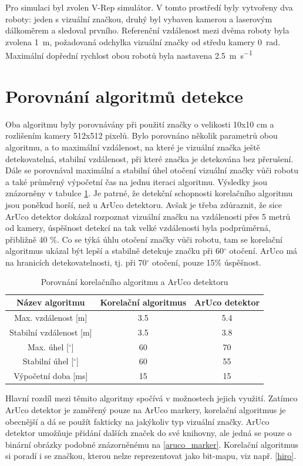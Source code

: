 \documentclass[twoside]{ctuthesis}
\theoremstyle{plain}
\theoremstyle{definition}
\theoremstyle{note}
\begin{document}
Pro simulaci byl zvolen V-Rep simulátor. V tomto prostředí byly vytvořeny dva roboty: jeden s vizuální značkou, druhý byl vybaven kamerou a laserovým dálkoměrem a sledoval prvního. Referenční vzdálenost mezi dvěma roboty byla zvolena \SI{1}{\meter}, požadovaná odchylka vizuální značky od středu kamery \SI{0}{\radian}. Maximální dopřední rychlost obou robotů byla nastavena \SI{2.5}{\meter\per\second}

\section{Porovnání algoritmů detekce}

Oba algoritmu byly porovnávány při použití značky o velikosti 10x10 cm a rozlišením kamery 512x512 pixelů. Bylo porovnáno několik parametrů obou algoritmu, a to maximální vzdálenost, na které je vizuální značka ještě detekovatelná, stabilní vzdálenost, při které značka je detekována bez přerušení. Dále se porovnával maximální a stabilní úhel otočení vizuální značky vůči robotu a také průměrný výpočetní čas na jednu iteraci algoritmu. Výsledky jsou znázorněny v tabulce \ref{porovnani}. Je patrné, že detekční schopnosti korelačního algoritmu jsou poněkud horší, než u ArUco detektoru. Avšak je třeba zdůraznit, že sice ArUco detektor dokázal rozpoznat vizuální značku na vzdálenosti přes 5 metrů od kamery, úspěšnost detekcí na tak velké vzdálenosti byla podprůměrná, přibližně 40 \%. Co se týká úhlu otočení značky vůči robotu, tam se korelační algoritmus ukázal být lepší a stabilně detekuje značku při 60$^\circ$ otočení. ArUco má na hranicích detekovatelnosti, tj. při 70$^\circ$ otočení, pouze 15\% úspěšnost.

\begin{table}[hbt]
	\centering
	\caption{Porovnání korelačního algoritmu a ArUco detektoru}
	\label{porovnani}
	\begin{tabular}{|c|c|c|}
		\hline
		Název algoritmu              & Korelační algoritmus & ArUco detektor \\ \hline
		Max. vzdálenost {[}m{]}      & 3.5                 & 5.4           \\ \hline
		Stabilní vzdálenost {[}m{]}  & 3.5                 & 3.8           \\ \hline
		Max. úhel {[}$^\circ${]}     & 60                   & 70             \\ \hline
		Stabilní úhel {[}$^\circ${]} & 60                   & 55             \\ \hline
		Výpočetní doba {[}ms{]}      & 15                   & 15             \\ \hline
	\end{tabular}
\end{table}
Hlavní rozdíl mezi těmito algoritmy spočívá v možnostech jejich využití. Zatímco ArUco detektor je zaměřený pouze na ArUco markery, korelační algoritmus je obecnější a dá se použít fakticky na jakýkoliv typ vizuální značky. ArUco detektor umožňuje přidání dalších značek do své knihovny, ale jedná se pouze o binární obrázky podobné znázorněnému na \ref{aruco_marker}. Korelační algoritmus si poradí i se značkou, kterou nelze reprezentovat jako bit-mapu, viz např. \ref{hiro}.
\end{document}
